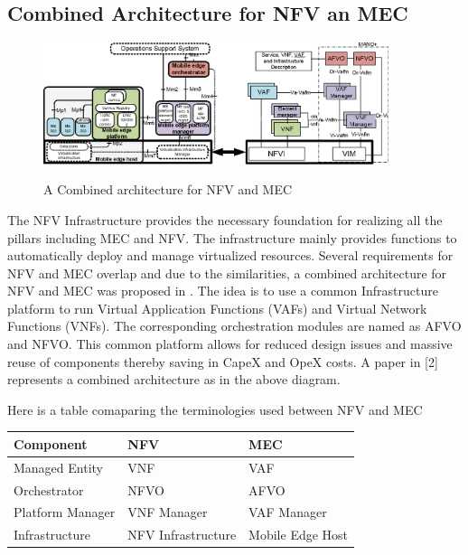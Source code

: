 \subsection{Combined Architecture for NFV an MEC}

\begin{figure}[ht!]
    \centering
    \includegraphics[width=0.9\textwidth]{images/combined_architecture}
    \label{fig:figure6}
    \caption{A Combined architecture for NFV and MEC}
\end{figure}

The NFV Infrastructure provides the necessary foundation for realizing all the pillars including MEC and NFV\@. The infrastructure mainly provides functions to automatically deploy and manage virtualized resources. Several requirements for NFV and MEC overlap and due to the similarities, a combined architecture for NFV and MEC was proposed in \cite{taleb17}. The idea is to use a common Infrastructure platform to run Virtual Application Functions (VAFs) and Virtual Network Functions (VNFs). The corresponding orchestration modules are named as AFVO and NFVO\@. This common platform allows for reduced design issues and massive reuse of components thereby saving in CapeX and OpeX costs. A paper in [2] represents a combined architecture as in the above diagram.


Here is a table comaparing the terminologies used between NFV and MEC

\begin{tabular}{||p{4cm}|p{4cm}|p{4cm}||}
\hline\hline
Component&NFV&MEC \\
\hline
Managed Entity&VNF&VAF \\
\hline
Orchestrator&NFVO&AFVO \\
\hline
Platform Manager&VNF Manager&VAF Manager \\
\hline
Infrastructure&NFV Infrastructure&Mobile Edge Host \\
\hline\hline
\end{tabular}
